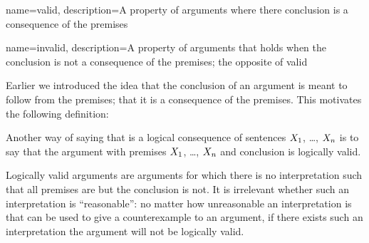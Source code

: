 	
{
name=valid,
description={A property of arguments where there conclusion is a consequence of the premises}
}

{
name=invalid,
description={A property of arguments that holds when the conclusion is not a consequence of the premises; the opposite of \gls{valid}}
}

Earlier we introduced the idea that the conclusion of an argument is meant to follow from the premises; that it is a consequence of the premises. This motivates the following definition:

	
Another way of saying that  \metaY is a logical consequence of sentences $X_1$, \dots, $X_n$ is to say that the argument with premises $X_1$, \dots, $X_n$ and conclusion \metaY is logically valid.

Logically valid arguments are arguments for which there is no interpretation such that all premises are but the conclusion is not. It is irrelevant whether such an interpretation is ``reasonable'': no matter how unreasonable an interpretation is that can be used to give a counterexample to an argument, if there exists such an interpretation the argument will not be logically valid.

